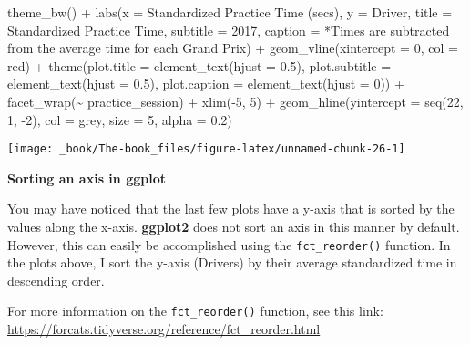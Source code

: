 \documentclass[
]{book}
\newenvironment{Shaded}{\begin{snugshade}}{\end{snugshade}}
\newcommand{\AttributeTok}[1]{\textcolor[rgb]{0.77,0.63,0.00}{#1}}
\newcommand{\DecValTok}[1]{\textcolor[rgb]{0.00,0.00,0.81}{#1}}
\newcommand{\FloatTok}[1]{\textcolor[rgb]{0.00,0.00,0.81}{#1}}
\newcommand{\FunctionTok}[1]{\textcolor[rgb]{0.00,0.00,0.00}{#1}}
\newcommand{\NormalTok}[1]{#1}
\newcommand{\SpecialCharTok}[1]{\textcolor[rgb]{0.00,0.00,0.00}{#1}}
\newcommand{\StringTok}[1]{\textcolor[rgb]{0.31,0.60,0.02}{#1}}
\begin{document}
\begin{Shaded}
\begin{Highlighting}[]
   \FunctionTok{theme\_bw}\NormalTok{() }\SpecialCharTok{+}
   \FunctionTok{labs}\NormalTok{(}\AttributeTok{x =} \StringTok{\textquotesingle{}Standardized Practice Time (secs)\textquotesingle{}}\NormalTok{,}
        \AttributeTok{y =} \StringTok{\textquotesingle{}Driver\textquotesingle{}}\NormalTok{,}
        \AttributeTok{title =} \StringTok{\textquotesingle{}Standardized Practice Time\textquotesingle{}}\NormalTok{,}
        \AttributeTok{subtitle =} \StringTok{\textquotesingle{}2017\textquotesingle{}}\NormalTok{,}
        \AttributeTok{caption =} \StringTok{\textquotesingle{}*Times are subtracted from the average time for each Grand Prix\textquotesingle{}}\NormalTok{) }\SpecialCharTok{+}
   \FunctionTok{geom\_vline}\NormalTok{(}\AttributeTok{xintercept =} \DecValTok{0}\NormalTok{, }\AttributeTok{col =} \StringTok{\textquotesingle{}red\textquotesingle{}}\NormalTok{) }\SpecialCharTok{+}
   \FunctionTok{theme}\NormalTok{(}\AttributeTok{plot.title =} \FunctionTok{element\_text}\NormalTok{(}\AttributeTok{hjust =} \FloatTok{0.5}\NormalTok{),}
         \AttributeTok{plot.subtitle =} \FunctionTok{element\_text}\NormalTok{(}\AttributeTok{hjust =} \FloatTok{0.5}\NormalTok{),}
         \AttributeTok{plot.caption =} \FunctionTok{element\_text}\NormalTok{(}\AttributeTok{hjust =} \DecValTok{0}\NormalTok{)) }\SpecialCharTok{+}
  \FunctionTok{facet\_wrap}\NormalTok{(}\SpecialCharTok{\textasciitilde{}}\NormalTok{ practice\_session) }\SpecialCharTok{+}
  \FunctionTok{xlim}\NormalTok{(}\SpecialCharTok{{-}}\DecValTok{5}\NormalTok{, }\DecValTok{5}\NormalTok{) }\SpecialCharTok{+}
  \FunctionTok{geom\_hline}\NormalTok{(}\AttributeTok{yintercept =} \FunctionTok{seq}\NormalTok{(}\DecValTok{22}\NormalTok{, }\DecValTok{1}\NormalTok{, }\SpecialCharTok{{-}}\DecValTok{2}\NormalTok{), }\AttributeTok{col =} \StringTok{\textquotesingle{}grey\textquotesingle{}}\NormalTok{, }\AttributeTok{size =} \DecValTok{5}\NormalTok{, }\AttributeTok{alpha =}  \FloatTok{0.2}\NormalTok{)}
\end{Highlighting}
\end{Shaded}

\begin{center}\texttt{[image: \_book/The-book\_files/figure-latex/unnamed-chunk-26-1]} \end{center}

\begin{blackbox}

\begin{center}
\textbf{Sorting an axis in ggplot}

\end{center}

You may have noticed that the last few plots have a y-axis that is sorted by the values along the x-axis. \textbf{ggplot2} does not sort an axis in this manner by default. However, this can easily be accomplished using the \texttt{fct\_reorder()} function. In the plots above, I sort the y-axis (Drivers) by their average standardized time in descending order.

For more information on the \texttt{fct\_reorder()} function, see this link: \url{https://forcats.tidyverse.org/reference/fct_reorder.html}

\end{blackbox}
\end{document}
